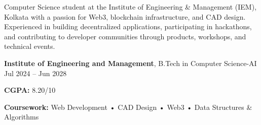 \documentclass{resume}
\begin{document}

Computer Science student at the Institute of Engineering \& Management (IEM), Kolkata with a passion for Web3, blockchain infrastructure, and CAD design. Experienced in building decentralized applications, participating in hackathons, and contributing to developer communities through products, workshops, and technical events.

\noindent\textbf{Institute of Engineering and Management}, B.Tech in Computer Science-AI \hfill Jul 2024 – Jun 2028
\begin{myitemize}
  \item \textbf{CGPA:} 8.20/10
  \item \textbf{Coursework:} Web Development • CAD Design • Web3 • Data Structures \& Algorithms
\end{myitemize}
\end{document}
